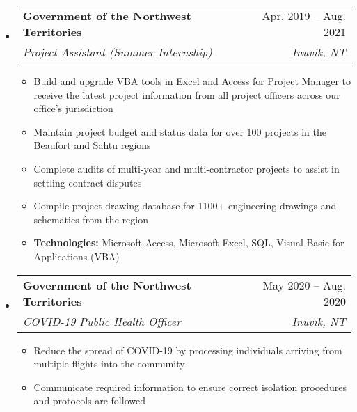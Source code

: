\documentclass[letterpaper,12pt]{article}[leftmargin=*]
\makeatletter
\def \entryspacing {-0pt}
\newcommand{\resumeEntryStart}{\begin{itemize}[leftmargin=2.5mm]}
\newcommand{\resumeEntryEnd}{\end{itemize}\vspace{\entryspacing}}
\newcommand{\resumeItemListStart}{\begin{itemize}[leftmargin=4.5mm]}
\newcommand{\resumeItemListEnd}{\end{itemize}}
\newcommand{\resumeItem}[1]{
  \item\small{
    {#1 \vspace{-2pt}}
  }
}
\newcommand{\resumeEntryTSDL}[4]{
  \vspace{-1pt}\item[]
    \begin{tabularx}{0.97\textwidth}{X@{\hspace{60pt}}r}
      \textbf{\color{primary}#1} & {\firabook\color{accent}\small#2} \\
      \textit{\color{accent}\small#3} & \textit{\color{accent}\small#4} \\
    \end{tabularx}\vspace{-6pt}
}
\makeatother
\begin{document}
  \resumeEntryStart
    \resumeEntryTSDL
      {Government of the Northwest Territories}{Apr. 2019 -- Aug. 2021}
      {Project Assistant (Summer Internship)}{Inuvik, NT}
    \resumeItemListStart
      \resumeItem {Build and upgrade VBA tools in Excel and Access for Project Manager to receive the latest
      project information from all project officers across our office's jurisdiction}
      \resumeItem {Maintain project budget and status data for over 100 projects in the Beaufort and Sahtu regions}
      \resumeItem {Complete audits of multi-year and multi-contractor projects to assist in settling contract disputes}
      \resumeItem {Compile project drawing database for 1100+ engineering drawings and schematics from the region}
      \resumeItem {\textbf{Technologies:} Microsoft Access, Microsoft Excel, SQL, Visual Basic for Applications (VBA)}
    \resumeItemListEnd
  \resumeEntryEnd

  \resumeEntryStart
  \resumeEntryTSDL
    {Government of the Northwest Territories}{May 2020 -- Aug. 2020}
    {COVID-19 Public Health Officer}{Inuvik, NT}
  \resumeItemListStart
    \resumeItem {Reduce the spread of COVID-19 by processing individuals arriving from multiple flights into the community}
    \resumeItem {Communicate required information to ensure correct isolation procedures and protocols are followed}
  \resumeItemListEnd
\resumeEntryEnd


\end{document}
